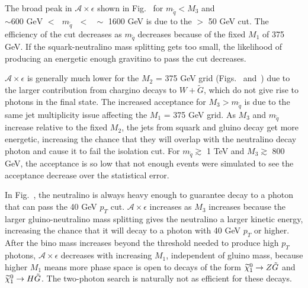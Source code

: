 \documentclass[dissertation.tex]{subfiles}
\begin{document}
The broad peak in $\mathcal{A}\times\epsilon$ shown in Fig.~ for $m_{\tilde{q}} < M_{3}$ and $\sim600\mbox{ GeV }<\mbox{ }m_{\tilde{q}}\mbox{ }<\mbox{ }\sim$ 1600 GeV is due to the \MET $>$ 50 GeV cut.  The efficiency of the cut decreases as $m_{\tilde{q}}$ decreases because of the fixed $M_{1}$ of 375 GeV.  If the squark-neutralino mass splitting gets too small, the likelihood of producing an energetic enough gravitino to pass the \MET cut decreases.

$\mathcal{A}\times\epsilon$ is generally much lower for the $M_{2}$ = 375 GeV grid (Figs.~ and~) due to the larger contribution from chargino decays to $W + \tilde{G}$, which do not give rise to photons in the final state.  The increased acceptance for $M_{3} > m_{\tilde{q}}$ is due to the same jet multiplicity issue affecting the $M_{1}$ = 375 GeV grid.  As $M_{3}$ and $m_{\tilde{q}}$ increase relative to the fixed $M_{2}$, the jets from squark and gluino decay get more energetic, increasing the chance that they will overlap with the neutralino decay photon and cause it to fail the isolation cut.  For $m_{\tilde{q}} \gtrsim$ 1 TeV and $M_{3} \gtrsim$ 800 GeV, the acceptance is so low that not enough events were simulated to see the acceptance decrease over the statistical error.

In Fig.~, the neutralino is always heavy enough to guarantee decay to a photon that can pass the 40 GeV $p_{T}$ cut.  $\mathcal{A}\times\epsilon$ increases as $M_{3}$ increases because the larger gluino-neutralino mass splitting gives the neutralino a larger kinetic energy, increasing the chance that it will decay to a photon with 40 GeV $p_{T}$ or higher.  After the bino mass increases beyond the threshold needed to produce high $p_{T}$ photons, $\mathcal{A}\times\epsilon$ decreases with increasing $M_{1}$, independent of gluino mass, because higher $M_{1}$ means more phase space is open to decays of the form $\widetilde{\chi}_{1}^{0}\rightarrow Z\tilde{G}$ and $\widetilde{\chi}_{1}^{0}\rightarrow H\tilde{G}$.  The two-photon search is naturally not as efficient for these decays.
\end{document}
